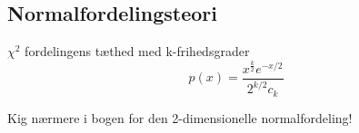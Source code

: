 \subsection{Normalfordelingsteori}

$\chi^2$ fordelingens tæthed med k-frihedsgrader
\begin{equation}
    p(x) = \frac{x^{\frac{k}{2}}e^{-x/2}}{2^{k/2}c_k}
\end{equation}

Kig nærmere i bogen for den 2-dimensionelle normalfordeling!